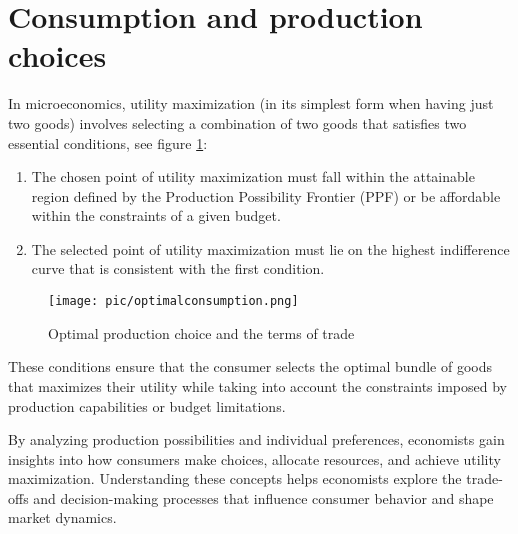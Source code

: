 

\pbn
\section{Consumption and production choices}\label{consumption-and-production-choices}

In microeconomics, utility maximization (in its simplest form when having just two goods) involves selecting a combination of two goods that satisfies two essential conditions, see figure \ref{fig:optimalconsumption}:

\begin{enumerate}
	\item
	The chosen point of utility maximization must fall within the attainable region defined by the Production Possibility Frontier (PPF) or be affordable within the constraints of a given budget.
	\item
	The selected point of utility maximization must lie on the highest indifference curve that is consistent with the first condition.
\end{enumerate}

\begin{figure}
	\centering
	\texttt{[image: pic/optimalconsumption.png]}
	\caption{\label{fig:optimalconsumption} Optimal production choice and the terms of trade}
\end{figure}

These conditions ensure that the consumer selects the optimal bundle of goods that maximizes their utility while taking into account the constraints imposed by production capabilities or budget limitations.

By analyzing production possibilities and individual preferences, economists gain insights into how consumers make choices, allocate resources, and achieve utility maximization. Understanding these concepts helps economists explore the trade-offs and decision-making processes that influence consumer behavior and shape market dynamics.

